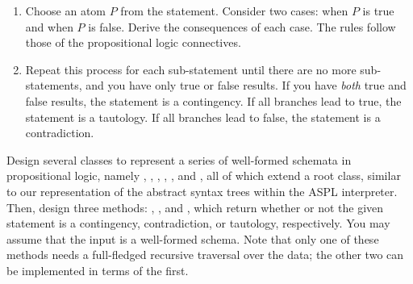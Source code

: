 \begin{enumerate}
    \item Choose an atom $P$ from the statement. Consider two cases: when $P$ is true and when $P$ is false. Derive the consequences of each case. The rules follow those of the propositional logic connectives.
    \item Repeat this process for each sub-statement until there are no more sub-statements, and you have only true or false results. If you have \textit{both} true and false results, the statement is a contingency. If all branches lead to true, the statement is a tautology. If all branches lead to false, the statement is a contradiction. 
\end{enumerate}

Design several classes to represent a series of well-formed schemata in propositional logic, namely , , , , , and , all of which extend a root  class, similar to our representation of the abstract syntax trees within the ASPL interpreter. Then, design three methods: , , and , which return whether or not the given statement is a contingency, contradiction, or tautology, respectively. You may assume that the input is a well-formed schema. Note that only one of these methods needs a full-fledged recursive traversal over the data; the other two can be implemented in terms of the first.





